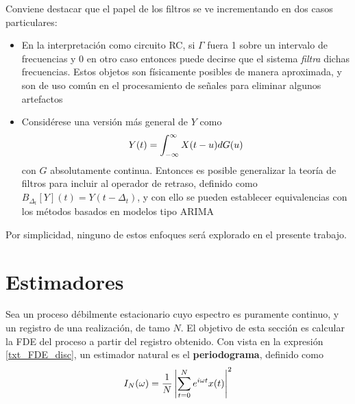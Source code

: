 Conviene destacar que el papel de los filtros se ve incrementando en dos casos particulares:
\begin{itemize}
\item En la interpretación como circuito RC, si $\Gamma$ fuera 1 sobre un intervalo de frecuencias
y 0 en otro caso entonces puede decirse que el sistema \textit{filtra} dichas frecuencias.
%
Estos objetos son físicamente posibles de manera aproximada, y son de uso común 
en el procesamiento de señales para eliminar algunos artefactos
\item Considérese una versión más general de $Y$ como
\begin{equation}
Y(t) = \int_{-\infty}^{\infty} X(t-u) dG(u)
\end{equation}
con $G$ absolutamente continua. Entonces es posible generalizar la teoría de filtros para incluir
al operador de retraso, definido como $B_{\Delta_t}[Y](t) = Y(t-\Delta_t)$, y con ello se pueden
establecer equivalencias con los métodos basados en modelos tipo ARIMA
\end{itemize}
Por simplicidad, ninguno de estos enfoques será explorado en el presente trabajo.


\section{Estimadores}

Sea \xt un proceso débilmente estacionario cuyo espectro es puramente continuo, y \xtd un registro 
de una realización, de tamo $N$. 
%
El objetivo de esta sección es calcular la FDE del proceso a partir del registro obtenido.
%
Con vista en la expresión \ref{txt_FDE_disc}, un estimador natural es el \textbf{periodograma}, 
definido como
\begin{equation}
I_N(\omega) = \frac{1}{N} \left| \sum_{t = 0}^{N} e^{i \omega t} x(t) \right|^{2}
\label{txt_periodograma}
\end{equation}


